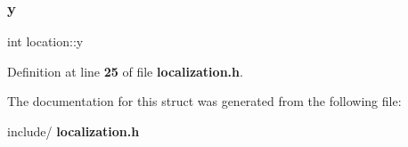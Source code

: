 \mbox{\label{structlocation_ad7197d1981d4ea5d8b36041473cac815}} 
\subsubsection{y}
{\footnotesize\ttfamily int location\+::y}



Definition at line \textbf{ 25} of file \textbf{ localization.\+h}.



The documentation for this struct was generated from the following file\+:\begin{DoxyCompactItemize}
\item 
include/\textbf{ localization.\+h}\end{DoxyCompactItemize}
